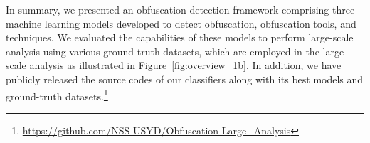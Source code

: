 In summary, we presented an obfuscation detection framework comprising three machine learning models developed to detect obfuscation, obfuscation tools, and techniques. We evaluated the capabilities of these models to perform large-scale analysis using various ground-truth datasets, which are employed in the large-scale analysis as illustrated in Figure~\ref{fig:overview_1b}. In addition, we have publicly released the source codes of our classifiers along with its best models and ground-truth datasets.\footnote{\href{https://github.com/NSS-USYD/Obfuscation-Large_Analysis}{https://github.com/NSS-USYD/Obfuscation-Large\_Analysis}}
